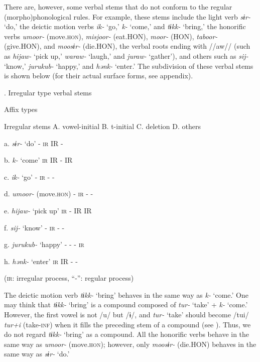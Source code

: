 There are, however, some verbal stems that do not conform to the regular (morpho)phonological rules. For example, these stems include the light verb \textit{sɨr-} ‘do,’ the deictic motion verbs \textit{ik-} ‘go,’ \textit{k-} ‘come,’ and \textit{tɨkk-} ‘bring,’ the honorific verbs \textit{umoor-} (move.\textsc{hon}), \textit{misjoor-} (eat.HON), \textit{moor-} (HON), \textit{taboor-} (give.HON), and \textit{moosɨr-} (die.HON), the verbal roots ending with //aw// (such as \textit{hijaw-} ‘pick up,’ \textit{waraw-} ‘laugh,’ and \textit{juraw-} ‘gather’), and others such as \textit{sij-} ‘know,’ \textit{jurukub-} ‘happy,’ and \textit{hənk-} ‘enter.’ The subdivision of these verbal stems is shown below (for their actual surface forms, see appendix).

\begin{styleBeschriftung}
\textmd{. Irregular type verbal stems}
\end{styleBeschriftung}

    Affix types

Irregular stems    A. vowel-initial  B. t-initial  C. deletion  D. others

a.  \textit{sɨr-} ‘do’    {}-  \textsc{ir}  IR  {}-

b.  \textit{k-} ‘come’    \textsc{ir}  IR  {}-  IR

c.  \textit{ik-} ‘go’    {}-  \textsc{ir}  {}-  {}-

d.  \textit{umoor-} (move.\textsc{hon})    {}-  \textsc{ir}  {}-  {}-

e.  \textit{hijaw-} ‘pick up’    \textsc{ir}  {}-  IR  IR

f.  \textit{sij-} ‘know’    {}-  \textsc{ir}  {}-  {}-

g.  \textit{jurukub-} ‘happy’    {}-  {}-  {}-  \textsc{ir}

h.  \textit{hənk-} ‘enter’    \textsc{ir}  IR  {}-  {}-

(\textsc{ir}: irregular process, “-”: regular process)

The deictic motion verb \textit{tɨkk-} ‘bring’ behaves in the same way as \textit{k-} ‘come.’ One may think that \textit{tɨkk-} ‘bring’ is a compound composed of \textit{tur-} ‘take’ + \textit{k-} ‘come.’ However, the first vowel is not /u/ but /ɨ/, and \textit{tur-} ‘take’ should become /tui/ \textit{tur+i} (take-\textsc{inf}) when it fills the preceding stem of a compound (see ). Thus, we do not regard \textit{tɨkk-} ‘bring’ as a compound. All the honorific verbs behave in the same way as \textit{umoor-} (move.\textsc{hon}); however, only \textit{moosɨr-} (die.HON) behaves in the same way as \textit{sɨr-} ‘do.’

